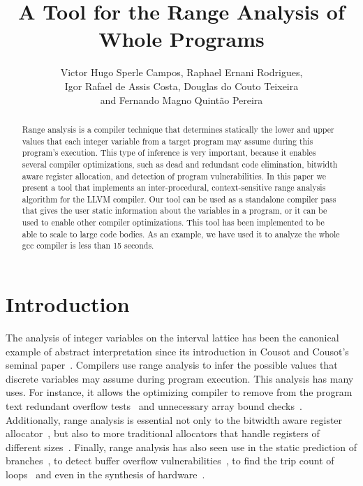\documentclass{paper}
\begin{document}
\lstset{language=, basicstyle=\small} 

\title{A Tool for the Range Analysis of Whole Programs}

\author{Victor Hugo Sperle Campos, Raphael Ernani Rodrigues, \\
Igor Rafael de Assis Costa, Douglas do Couto Teixeira \\
and Fernando Magno Quint\~{a}o Pereira}

\address{UFMG -- 6627 Ant\^{o}nio Carlos Av, 31.270-010, Belo Horizonte, Brazil
}


\maketitle

\begin{abstract}
Range analysis is a compiler technique that determines statically the lower and
upper values that each integer variable from a target program may assume
during this program's execution.
This type of inference is very important, because it enables several compiler
optimizations, such as dead and redundant code elimination, bitwidth aware
register allocation, and detection of program vulnerabilities.
In this paper we present a tool that implements an inter-procedural,
context-sensitive  range analysis algorithm for the LLVM compiler.
Our tool can be used as a standalone compiler pass that gives the user
static information about the variables in a program, or it can be used to
enable other compiler optimizations.
This tool has been implemented to be able to scale to large code bodies.
As an example, we have used it to analyze the whole gcc compiler is less than
15 seconds.
\end{abstract}

\section{Introduction}
\label{sec:intro}

The analysis of integer variables on the interval lattice has been the
canonical example of abstract interpretation since its introduction in
Cousot and Cousot's seminal paper~\cite{Cousot77}.
Compilers use range analysis to infer the possible values that discrete
variables may assume during program execution.
This analysis has many uses.
For instance, it allows the optimizing compiler to remove from the program text
redundant overflow tests~\cite{Sol11} and unnecessary array bound
checks~\cite{Bodik00}.
Additionally, range analysis is essential not only to the bitwidth aware
register allocator~\cite{Barik06}, but also to more traditional
allocators that handle registers of different
sizes~\cite{Pereira08}.
Finally, range analysis has also seen use in the static prediction of
branches~\cite{Patterson95}, to detect buffer overflow
vulnerabilities~\cite{Simon08}, to find the trip count of
loops~\cite{Lokuciejewski09}
and even in the synthesis of hardware~\cite{Mahlke01}.
\end{document}
